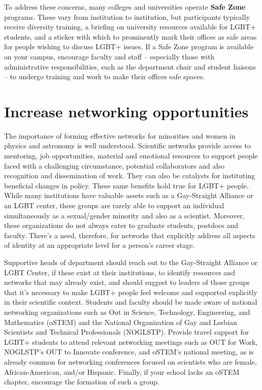 To address these concerns, many colleges and universities operate \textbf{Safe Zone} programs. These vary from institution to institution, but participants typically receive diversity training, a briefing on university resources available for LGBT+ students, and a sticker with which to prominently mark their offices as safe areas for people wishing to discuss LGBT+ issues. If a Safe Zone program is available on your campus, encourage faculty and staff -- especially those with administrative responsibilities, such as the department chair and student liaisons -- to undergo training and work to make their offices safe spaces.


\section {Increase networking opportunities}
\label{networking}
The importance of forming effective networks for minorities and women in physics and astronomy is well understood. Scientific networks provide access to mentoring, job opportunities, material and emotional resources to support people faced with a challenging circumstance, potential collaborators and also recognition and dissemination of work. They can also be catalysts for instituting beneficial changes in policy. These same benefits hold true for LGBT+ people. While many institutions have valuable assets such as a Gay-Straight Alliance or an LGBT center, these groups are rarely able to support an individual simultaneously as a sexual/gender minority and also as a scientist. Moreover, these organizations do not always cater to graduate students, postdocs and faculty. There's a need, therefore, for networks that explicitly address all aspects of identity at an appropriate level for a person's career stage.

Supportive heads of department should reach out to the Gay-Straight Alliance or LGBT Center, if these exist at their institutions, to identify resources and networks that may already exist, and should suggest to leaders of those groups that it's necessary to make LGBT+ people feel welcome and supported explicitly in their scientific context. Students and faculty should be made aware of national networking organizations such as Out in Science, Technology, Engineering, and Mathematics (oSTEM) and the National Organization of Gay and Lesbian Scientists and Technical Professionals (NOGLSTP). Provide travel support for LGBT+ students to attend relevant networking meetings such as OUT for Work, NOGLSTP's OUT to Innovate conference, and oSTEM's national meeting, as is already common for networking conferences focused on scientists who are female, African-American, and/or Hispanic. Finally, if your school lacks an oSTEM chapter, encourage the formation of such a group.


